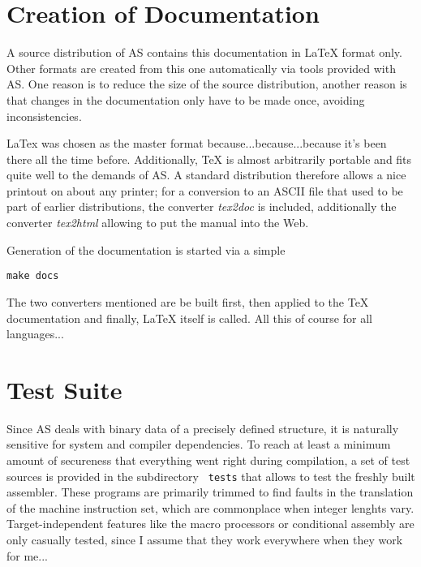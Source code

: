 \documentclass[12pt,twoside]{report}
\begin{document}

\section{Creation of Documentation}

A source distribution of AS contains this documentation in LaTeX format
only.  Other formats are created from this one automatically  via tools
provided with AS.  One reason is to reduce the size of the source
distribution, another reason is that changes in the documentation only
have to be made once, avoiding inconsistencies.

LaTex was chosen as the master format because...because...because it's
been there all the time before.  Additionally, TeX is almost arbitrarily
portable and fits quite well to the demands of AS.  A standard
distribution therefore allows a nice printout on about any printer; for a
conversion to an ASCII file that used to be part of earlier distributions,
the converter {\em tex2doc} is included, additionally the converter {\em
tex2html} allowing to put the manual into the Web.

Generation of the documentation is started via a simple
\begin{verbatim}
make docs
\end{verbatim}
The two converters mentioned are be built first, then applied to the TeX
documentation and finally, LaTeX itself is called.  All this of course for
all languages...


\section{Test Suite}

Since AS deals with binary data of a precisely defined structure, it is
naturally sensitive for system and compiler dependencies.  To reach at
least a minimum amount of secureness that everything went right during
compilation, a set of test sources is provided in the subdirectory {\tt
tests} that allows to test the freshly built assembler.  These programs
are primarily trimmed to find faults in the translation of the machine
instruction set, which are commonplace when integer lenghts vary. 
Target-independent features like the macro processors or conditional
assembly are only casually tested, since I assume that they work
everywhere when they work for me...
\end{document}
